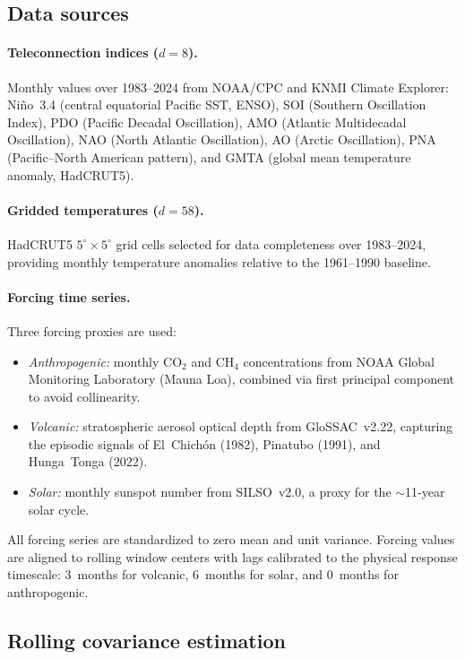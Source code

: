 \documentclass[preprint,12pt]{elsarticle}
\begin{document}
\subsection{Data sources}\label{sec:data}

\paragraph{Teleconnection indices ($d=8$).}
Monthly values over 1983--2024 from NOAA/CPC and KNMI Climate Explorer:
Ni\~{n}o~3.4 (central equatorial Pacific SST, ENSO), SOI (Southern Oscillation Index), PDO (Pacific Decadal Oscillation), AMO (Atlantic Multidecadal Oscillation), NAO (North Atlantic Oscillation), AO (Arctic Oscillation), PNA (Pacific--North American pattern), and GMTA (global mean temperature anomaly, HadCRUT5).

\paragraph{Gridded temperatures ($d=58$).}
HadCRUT5 $5^\circ \times 5^\circ$ grid cells selected for data completeness over 1983--2024, providing monthly temperature anomalies relative to the 1961--1990 baseline.

\paragraph{Forcing time series.}
Three forcing proxies are used:
\begin{itemize}
\item \emph{Anthropogenic:} monthly CO$_2$ and CH$_4$ concentrations from NOAA Global Monitoring Laboratory (Mauna Loa), combined via first principal component to avoid collinearity.
\item \emph{Volcanic:} stratospheric aerosol optical depth from GloSSAC~v2.22, capturing the episodic signals of El~Chich\'{o}n (1982), Pinatubo (1991), and Hunga~Tonga (2022).
\item \emph{Solar:} monthly sunspot number from SILSO~v2.0, a proxy for the $\sim$11-year solar cycle.
\end{itemize}
All forcing series are standardized to zero mean and unit variance.
Forcing values are aligned to rolling window centers with lags calibrated to the physical response timescale: 3~months for volcanic, 6~months for solar, and 0~months for anthropogenic.

\subsection{Rolling covariance estimation}\label{sec:rolling}
\end{document}
